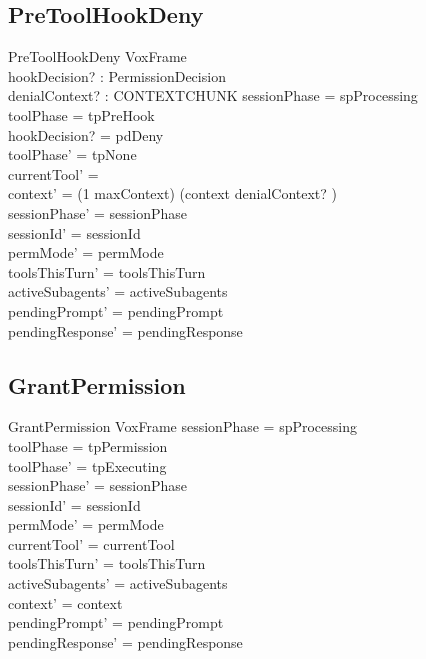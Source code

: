 \documentclass[a4paper,10pt,fleqn]{article}
\begin{document}
\subsection{PreToolHookDeny}

\begin{schema}{PreToolHookDeny}
  VoxFrame \\
  hookDecision? : PermissionDecision \\
  denialContext? : CONTEXTCHUNK
  \where
  sessionPhase = spProcessing \\
  toolPhase = tpPreHook \\
  hookDecision? = pdDeny \\
  toolPhase' = tpNone \\
  currentTool' = \emptyset \\
  context' = (1 \upto maxContext) \dres (context \cat \langle denialContext? \rangle) \\
  sessionPhase' = sessionPhase \\
  sessionId' = sessionId \\
  permMode' = permMode \\
  toolsThisTurn' = toolsThisTurn \\
  activeSubagents' = activeSubagents \\
  pendingPrompt' = pendingPrompt \\
  pendingResponse' = pendingResponse
\end{schema}

\subsection{GrantPermission}

\begin{schema}{GrantPermission}
  VoxFrame
  \where
  sessionPhase = spProcessing \\
  toolPhase = tpPermission \\
  toolPhase' = tpExecuting \\
  sessionPhase' = sessionPhase \\
  sessionId' = sessionId \\
  permMode' = permMode \\
  currentTool' = currentTool \\
  toolsThisTurn' = toolsThisTurn \\
  activeSubagents' = activeSubagents \\
  context' = context \\
  pendingPrompt' = pendingPrompt \\
  pendingResponse' = pendingResponse
\end{schema}
\end{document}
